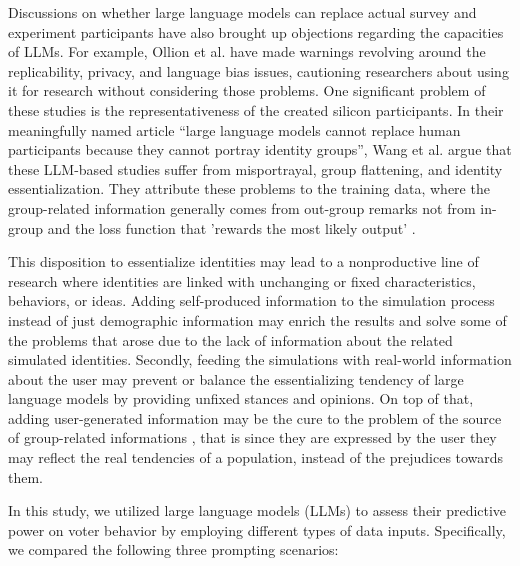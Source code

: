 \documentclass[sigconf,natbib=false]{acmart}
\begin{document}
Discussions on whether large language models can replace actual survey and experiment participants have also brought up objections regarding the capacities of LLMs. For example, Ollion et al. \cite{Ollion2024} have made warnings revolving around the replicability, privacy, and language bias issues, cautioning researchers about using it for research without considering those problems. One significant problem of these studies is the representativeness of the created silicon participants. In their meaningfully named article “large language models cannot replace human participants because they cannot portray identity groups”, Wang et al. \cite{Wang2024} argue that these LLM-based studies suffer from misportrayal, group flattening, and identity essentialization. They attribute these problems to the training data, where the group-related information generally comes from out-group remarks not from in-group and the loss function that 'rewards the most likely output' \cite{Wang2024}.

This disposition to essentialize identities may lead to a nonproductive line of research where identities are linked with unchanging or fixed characteristics, behaviors, or ideas. Adding self-produced information to the simulation process instead of just demographic information may enrich the results and solve some of the problems that arose due to the lack of information about the related simulated identities. Secondly, feeding the simulations with real-world information about the user may prevent or balance the essentializing tendency of large language models by providing unfixed stances and opinions. On top of that, adding user-generated information may be the cure to the problem of the source of group-related informations \cite{Wang2024}, that is since they are expressed by the user they may reflect the real tendencies of a population, instead of the prejudices towards them.

In this study, we utilized large language models (LLMs) to assess their predictive power on voter behavior by employing different types of data inputs. Specifically, we compared the following three prompting scenarios:
\end{document}
